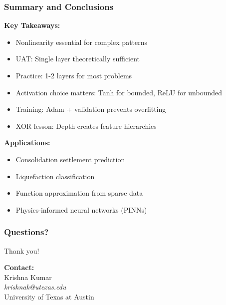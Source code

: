 \documentclass[notes]{beamer}
\begin{document}
\begin{frame}
\frametitle{Summary and Conclusions}

\textbf{Key Takeaways:}
\begin{itemize}
\item Nonlinearity essential for complex patterns
\item UAT: Single layer theoretically sufficient
\item Practice: 1-2 layers for most problems
\item Activation choice matters: Tanh for bounded, ReLU for unbounded
\item Training: Adam + validation prevents overfitting
\item XOR lesson: Depth creates feature hierarchies
\end{itemize}

\textbf{Applications:}
\begin{itemize}
\item Consolidation settlement prediction
\item Liquefaction classification
\item Function approximation from sparse data
\item Physics-informed neural networks (PINNs)
\end{itemize}

\end{frame}

\begin{frame}
\frametitle{Questions?}

\centering
\Large Thank you!

\vspace{2cm}

\textbf{Contact:} \\
Krishna Kumar \\
\textit{krishnak@utexas.edu} \\
University of Texas at Austin

\end{frame}
\end{document}

